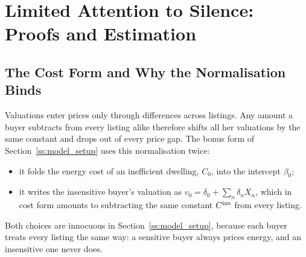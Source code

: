 
\section{Limited Attention to Silence: Proofs and Estimation}
\label{app:attention}


\subsection*{The Cost Form and Why the Normalisation Binds}

Valuations enter prices only through differences across listings. Any amount a buyer subtracts from every listing alike therefore shifts all her valuations by the same constant and drops out of every price gap. The bonus form of Section~\ref{ss:model_setup} uses this normalisation twice:
\begin{itemize}
    \item it folds the energy cost of an inefficient dwelling, $C_0$, into the intercept $\beta_0$;
    \item it writes the insensitive buyer's valuation as $v_0=\delta_0+\sum_n\delta_nX_n$, which in cost form amounts to subtracting the same constant $C^{\rm ins}$ from every listing.
\end{itemize}
Both choices are innocuous in Section~\ref{ss:model_setup}, because each buyer treats every listing the same way: a sensitive buyer always prices energy, and an insensitive one never does.

